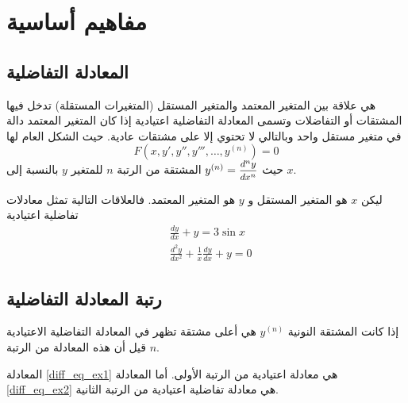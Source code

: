 \chapter{مفاهيم أساسية} 
\section[المعادلة التفاضلية]{المعادلة التفاضلية}


    هي علاقة بين المتغير المعتمد والمتغير المستقل (المتغيرات المستقلة) تدخل فيها المشتقات أو التفاضلات وتسمى المعادلة التفاضلية اعتيادية إذا كان المتغير المعتمد دالة في متغير مستقل واحد وبالتالي لا تحتوي إلا على مشتقات عادية. حيث الشكل العام لها
\[
F(x,y',y'',y''',\dots,y^{(n)})=0
\]
حيث $y^{(n)}=\mfrac{d^ny}{dx^n}$ المشتقة من الرتبة $n$ للمتغير $y$ بالنسبة إلى $x$.

\begin{example}
    ليكن $x$ هو المتغير المستقل و $y$ هو المتغير المعتمد. فالعلاقات التالية تمثل معادلات تفاضلية اعتيادية
    \begin{align}
        &\frac{dy}{dx}+y=3\sin x\label{diff_eq_ex1}\\
        &\frac{d^2y}{dx^2}+\frac{1}{x}\frac{dy}{dx}+y=0\label{diff_eq_ex2}
    \end{align}
\end{example}

\section[رتبة المعادلة التفاضلية]{رتبة المعادلة التفاضلية}
    إذا كانت المشتقة النونية $y^{(n)}$ هي أعلى مشتقة تظهر في المعادلة التفاضلية الاعتيادية قيل أن هذه المعادلة من الرتبة $n$.

\begin{example}
    المعادلة \eqref{diff_eq_ex1} هي معادلة اعتيادية من الرتبة الأولى. أما المعادلة \eqref{diff_eq_ex2} هي معادلة تفاضلية اعتيادية من الرتبة الثانية.
\end{example}

